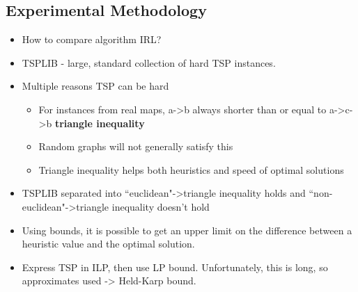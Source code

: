 \documentclass[12pt, letter]{article}
\begin{document}
\subsection*{Experimental Methodology}
\begin{itemize}
    \item How to compare algorithm IRL?
    \item TSPLIB - large, standard collection of hard TSP instances.
    \item Multiple reasons TSP can be hard
    \begin{itemize}
        \item For instances from real maps, a->b always shorter than or equal to a->c->b \textbf{triangle inequality} 
        \item Random graphs will not generally satisfy this
        \item Triangle inequality helps both heuristics and speed of optimal solutions
    \end{itemize}
    \item TSPLIB separated into ``euclidean"->triangle inequality holds and ``non-euclidean"->triangle inequality doesn't hold
    \item Using bounds, it is possible to get an upper limit on the difference between a heuristic value and the optimal solution.
    \item Express TSP in ILP, then use LP bound. Unfortunately, this is long, so approximates used -> Held-Karp bound.
\end{itemize}
\end{document}
